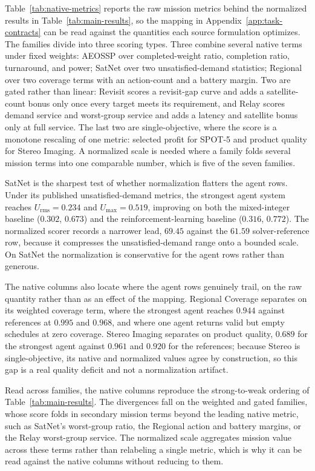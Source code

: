 \documentclass[11pt]{article}
\begin{document}
Table~\ref{tab:native-metrics} reports the raw mission metrics behind the normalized results in Table~\ref{tab:main-results}, so the mapping in Appendix~\ref{app:task-contracts} can be read against the quantities each source formulation optimizes. The families divide into three scoring types. Three combine several native terms under fixed weights: AEOSSP over completed-weight ratio, completion ratio, turnaround, and power; SatNet over two unsatisfied-demand statistics; Regional over two coverage terms with an action-count and a battery margin. Two are gated rather than linear: Revisit scores a revisit-gap curve and adds a satellite-count bonus only once every target meets its requirement, and Relay scores demand service and worst-group service and adds a latency and satellite bonus only at full service. The last two are single-objective, where the score is a monotone rescaling of one metric: selected profit for SPOT-5 and product quality for Stereo Imaging. A normalized scale is needed where a family folds several mission terms into one comparable number, which is five of the seven families.

SatNet is the sharpest test of whether normalization flatters the agent rows. Under its published unsatisfied-demand metrics, the strongest agent system reaches $U_{\mathrm{rms}}=0.234$ and $U_{\max}=0.519$, improving on both the mixed-integer baseline ($0.302$, $0.673$) and the reinforcement-learning baseline ($0.316$, $0.772$). The normalized scorer records a narrower lead, $69.45$ against the $61.59$ solver-reference row, because it compresses the unsatisfied-demand range onto a bounded scale. On SatNet the normalization is conservative for the agent rows rather than generous.

The native columns also locate where the agent rows genuinely trail, on the raw quantity rather than as an effect of the mapping. Regional Coverage separates on its weighted coverage term, where the strongest agent reaches $0.944$ against references at $0.995$ and $0.968$, and where one agent returns valid but empty schedules at zero coverage. Stereo Imaging separates on product quality, $0.689$ for the strongest agent against $0.961$ and $0.920$ for the references; because Stereo is single-objective, its native and normalized values agree by construction, so this gap is a real quality deficit and not a normalization artifact.

Read across families, the native columns reproduce the strong-to-weak ordering of Table~\ref{tab:main-results}. The divergences fall on the weighted and gated families, whose score folds in secondary mission terms beyond the leading native metric, such as SatNet's worst-group ratio, the Regional action and battery margins, or the Relay worst-group service. The normalized scale aggregates mission value across these terms rather than relabeling a single metric, which is why it can be read against the native columns without reducing to them.
\end{document}
